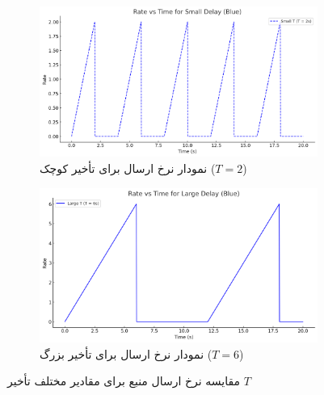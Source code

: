 \begin{figure}[h!]
	\centering
	\begin{subfigure}[b]{0.45\textwidth}
		\centering
		\includegraphics[width=\textwidth]{pics/img2.png}
		\caption{نمودار نرخ ارسال برای تأخیر کوچک (\( T = 2 \))}
		\label{fig:small_T}
	\end{subfigure}
	\hfill
	\begin{subfigure}[b]{0.45\textwidth}
		\centering
		\includegraphics[width=\textwidth]{pics/img3.png}
		\caption{نمودار نرخ ارسال برای تأخیر بزرگ (\( T = 6 \))}
		\label{fig:large_T}
	\end{subfigure}
	\caption{مقایسه نرخ ارسال منبع برای مقادیر مختلف تأخیر \( T \)}
	\label{fig:rate_comparison}
\end{figure}